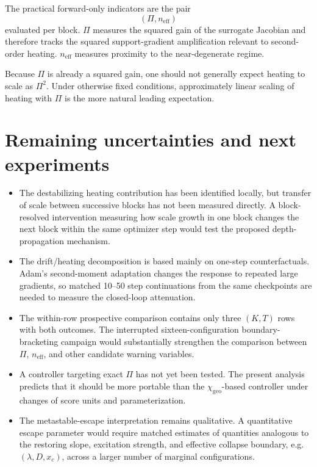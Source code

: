 \documentclass[11pt,a4paper]{article}
\newcommand{\neff}{n_{\mathrm{eff}}}
\newcommand{\chigeo}{\chi_{\mathrm{geo}}}
\newcommand{\Pisurr}{\Pi}
\begin{document}
The practical forward-only indicators are the pair
\[
(\Pisurr,\neff)
\]
evaluated per block. \(\Pisurr\) measures the squared gain of the surrogate Jacobian and therefore tracks the squared support-gradient amplification relevant to second-order heating. \(\neff\) measures proximity to the near-degenerate regime.

Because \(\Pisurr\) is already a squared gain, one should not generally expect heating to scale as \(\Pisurr^2\). Under otherwise fixed conditions, approximately linear scaling of heating with \(\Pisurr\) is the more natural leading expectation.

\section{Remaining uncertainties and next experiments}

\begin{itemize}[leftmargin=1.4em]
\item The destabilizing heating contribution has been identified locally, but transfer of scale between successive blocks has not been measured directly. A block-resolved intervention measuring how scale growth in one block changes the next block within the same optimizer step would test the proposed depth-propagation mechanism.

\item The drift/heating decomposition is based mainly on one-step counterfactuals. Adam's second-moment adaptation changes the response to repeated large gradients, so matched 10--50 step continuations from the same checkpoints are needed to measure the closed-loop attenuation.

\item The within-row prospective comparison contains only three \((K,T)\) rows with both outcomes. The interrupted sixteen-configuration boundary-bracketing campaign would substantially strengthen the comparison between \(\Pisurr\), \(\neff\), and other candidate warning variables.

\item A controller targeting exact \(\Pisurr\) has not yet been tested. The present analysis predicts that it should be more portable than the \(\chigeo\)-based controller under changes of score units and parameterization.

\item The metastable-escape interpretation remains qualitative. A quantitative escape parameter would require matched estimates of quantities analogous to the restoring slope, excitation strength, and effective collapse boundary, e.g.\ \((\lambda,D,x_c)\), across a larger number of marginal configurations.
\end{itemize}
\end{document}
